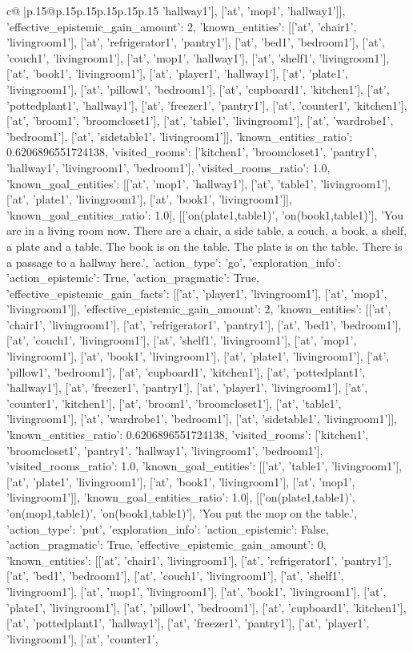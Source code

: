 \documentclass{article}
\begin{document}
{\begin{supertabular}{c@{$\;$}|p{.15\linewidth}@{}p{.15\linewidth}p{.15\linewidth}p{.15\linewidth}p{.15\linewidth}p{.15\linewidth}}
{{{'hallway1'], ['at', 'mop1', 'hallway1']], 'effective_epistemic_gain_amount': 2, 'known_entities': [['at', 'chair1', 'livingroom1'], ['at', 'refrigerator1', 'pantry1'], ['at', 'bed1', 'bedroom1'], ['at', 'couch1', 'livingroom1'], ['at', 'mop1', 'hallway1'], ['at', 'shelf1', 'livingroom1'], ['at', 'book1', 'livingroom1'], ['at', 'player1', 'hallway1'], ['at', 'plate1', 'livingroom1'], ['at', 'pillow1', 'bedroom1'], ['at', 'cupboard1', 'kitchen1'], ['at', 'pottedplant1', 'hallway1'], ['at', 'freezer1', 'pantry1'], ['at', 'counter1', 'kitchen1'], ['at', 'broom1', 'broomcloset1'], ['at', 'table1', 'livingroom1'], ['at', 'wardrobe1', 'bedroom1'], ['at', 'sidetable1', 'livingroom1']], 'known_entities_ratio': 0.6206896551724138, 'visited_rooms': ['kitchen1', 'broomcloset1', 'pantry1', 'hallway1', 'livingroom1', 'bedroom1'], 'visited_rooms_ratio': 1.0, 'known_goal_entities': [['at', 'mop1', 'hallway1'], ['at', 'table1', 'livingroom1'], ['at', 'plate1', 'livingroom1'], ['at', 'book1', 'livingroom1']], 'known_goal_entities_ratio': 1.0}}], [['on(plate1,table1)', 'on(book1,table1)'], 'You are in a living room now. There are a chair, a side table, a couch, a book, a shelf, a plate and a table. The book is on the table. The plate is on the table. There is a passage to a hallway here.', {'action_type': 'go', 'exploration_info': {'action_epistemic': True, 'action_pragmatic': True, 'effective_epistemic_gain_facts': [['at', 'player1', 'livingroom1'], ['at', 'mop1', 'livingroom1']], 'effective_epistemic_gain_amount': 2, 'known_entities': [['at', 'chair1', 'livingroom1'], ['at', 'refrigerator1', 'pantry1'], ['at', 'bed1', 'bedroom1'], ['at', 'couch1', 'livingroom1'], ['at', 'shelf1', 'livingroom1'], ['at', 'mop1', 'livingroom1'], ['at', 'book1', 'livingroom1'], ['at', 'plate1', 'livingroom1'], ['at', 'pillow1', 'bedroom1'], ['at', 'cupboard1', 'kitchen1'], ['at', 'pottedplant1', 'hallway1'], ['at', 'freezer1', 'pantry1'], ['at', 'player1', 'livingroom1'], ['at', 'counter1', 'kitchen1'], ['at', 'broom1', 'broomcloset1'], ['at', 'table1', 'livingroom1'], ['at', 'wardrobe1', 'bedroom1'], ['at', 'sidetable1', 'livingroom1']], 'known_entities_ratio': 0.6206896551724138, 'visited_rooms': ['kitchen1', 'broomcloset1', 'pantry1', 'hallway1', 'livingroom1', 'bedroom1'], 'visited_rooms_ratio': 1.0, 'known_goal_entities': [['at', 'table1', 'livingroom1'], ['at', 'plate1', 'livingroom1'], ['at', 'book1', 'livingroom1'], ['at', 'mop1', 'livingroom1']], 'known_goal_entities_ratio': 1.0}}], [['on(plate1,table1)', 'on(mop1,table1)', 'on(book1,table1)'], 'You put the mop on the table.', {'action_type': 'put', 'exploration_info': {'action_epistemic': False, 'action_pragmatic': True, 'effective_epistemic_gain_amount': 0, 'known_entities': [['at', 'chair1', 'livingroom1'], ['at', 'refrigerator1', 'pantry1'], ['at', 'bed1', 'bedroom1'], ['at', 'couch1', 'livingroom1'], ['at', 'shelf1', 'livingroom1'], ['at', 'mop1', 'livingroom1'], ['at', 'book1', 'livingroom1'], ['at', 'plate1', 'livingroom1'], ['at', 'pillow1', 'bedroom1'], ['at', 'cupboard1', 'kitchen1'], ['at', 'pottedplant1', 'hallway1'], ['at', 'freezer1', 'pantry1'], ['at', 'player1', 'livingroom1'], ['at', 'counter1', }}}
\end{supertabular}}
\end{document}
